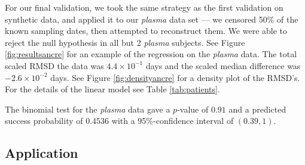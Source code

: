\documentclass[12pt]{article}
\begin{document}

For our final validation, we took the same strategy as the first validation on synthetic data, and applied it to our {\em plasma} data set --- we censored 50\% of the known sampling dates, then attempted to reconstruct them.
We were able to reject the null hypothesis in all but 2 {\em plasma} subjects.
See Figure \ref{fig:resultsancre} for an example of the regression on the \emph{plasma} data.
The total scaled RMSD the data was $4.4 \times 10^{-1}$ days and the scaled median difference was $-2.6 \times 10^{-2}$ days.
See Figure \ref{fig:densityancre} for a density plot of the RMSD's.
For the details of the linear model see Table \ref{tab:patients}.

The binomial test for the \emph{plasma} data gave a $p$-value of $0.91$ and a predicted success probability of $0.4536$ with a 95\%-confidence interval of $(0.39, 1)$.

\subsection * {Application} \label{sec:mixed_data}
\end{document}
